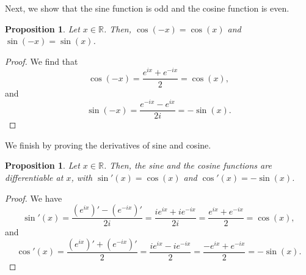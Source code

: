 \documentclass[a4paper, openany]{memoir}
\theoremstyle{definition}
\theoremstyle{plain}
\newtheorem{proposition}[definition]{Proposition}
\begin{document}
\noindent Next, we show that the sine function is odd and the cosine function is even.
\begin{proposition}
Let $x \in \mathbb{R}$. Then, $\cos (-x) = \cos (x)$ and $\sin (-x) = \sin (x)$.
\end{proposition}
\begin{proof}
We find that
\[\cos (-x) = \frac{e^{ix} + e^{-ix}}{2} = \cos (x),\]
and
\[\sin (-x) = \frac{e^{-ix} - e^{ix}}{2i} = -\sin (x).\]
\end{proof}
\noindent We finish by proving the derivatives of sine and cosine.
\begin{proposition}
Let $x \in \mathbb{R}$. Then, the sine and the cosine functions are differentiable at $x$, with $\sin'(x) = \cos(x)$ and $\cos'(x) = -\sin(x)$.
\end{proposition}
\begin{proof}
We have
\[\sin'(x) = \frac{(e^{ix})' - (e^{-ix})'}{2i} = \frac{ie^{ix} + ie^{-ix}}{2i} = \frac{e^{ix} + e^{-ix}}{2} = \cos (x),\]
and
\[\cos'(x) = \frac{(e^{ix})' + (e^{-ix})'}{2} = \frac{ie^{ix} -ie^{-ix}}{2} = \frac{-e^{ix} + e^{-ix}}{2} = -\sin (x).\]
\end{proof}
\end{document}

